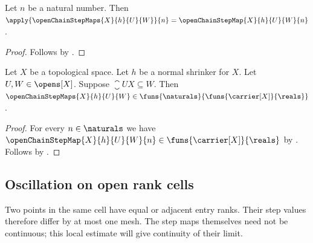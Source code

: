 \begin{proposition}\label{open_chain_step_maps_apply}
    Let $n$ be a natural number.
    Then
        $\apply{\openChainStepMaps{X}{h}{U}{W}}{n}
            =\openChainStepMap{X}{h}{U}{W}{n}$.
\end{proposition}
\begin{proof}
    Follows by
        .
\end{proof}

\begin{theorem}\label{open_chain_step_maps_typed}
    Let $X$ be a topological space.
    Let $h$ be a normal shrinker for $X$.
    Let $U,W\in\opens[X]$.
    Suppose $\closure{U}{X}\subseteq W$.
    Then
        $\openChainStepMaps{X}{h}{U}{W}
        \in\funs{\naturals}{\funs{\carrier[X]}{\reals}}$.
\end{theorem}
\begin{proof}
    For every $n\in\naturals$ we have
        $\openChainStepMap{X}{h}{U}{W}{n}
            \in\funs{\carrier[X]}{\reals}$
        by .
    Follows by
        .
\end{proof}

\subsection{Oscillation on open rank cells}

Two points in the same cell have equal or adjacent entry ranks. Their step
values therefore differ by at most one mesh. The step maps themselves need
not be continuous; this local estimate will give continuity of their limit.

